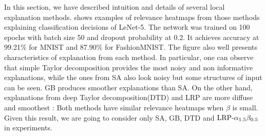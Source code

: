 In this section, we have described intuition and details of several local explanation methods. \addfigure{\ref{fig:lenet_heatmaps}} shows  examples of relevance heatmaps from those methods explaining classification decisions of LeNet-5\cite{LeCunGradientBasedLearningApplied2001}. The network was trained on 100 epochs with batch size 50 and dropout probability at 0.2. It achieves accuracy at 99.21\% for MNIST and 87.90\% for FashionMNIST. The figure also well presents characteristics of explanation from each method. In particular, one can observe that simple Taylor decomposition provides the most noisy and non informative explanations, while the ones from SA also look noisy but some structures of input can be seen. GB produces smoother explanations than SA. On the other hand, explanations from deep Taylor decomposition(DTD) and LRP are more diffuse and smoothest : Both methods have similar relevance heatmaps when $\beta$ is small. Given this result, we are going to consider only SA, GB, DTD and $\text{LRP-}\alpha_{1.5}\beta_{0.5}$ in experiments.

	
